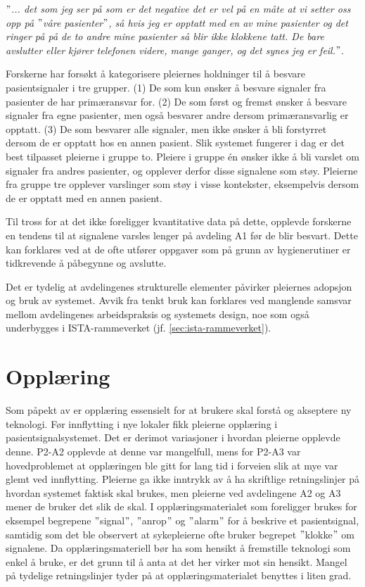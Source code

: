 \noindent
\textit{$"$... det som jeg ser på som er det negative det er vel på en måte at vi setter oss opp på $"$våre pasienter$"$, så hvis jeg er opptatt med en av mine pasienter og det ringer på på de to andre mine pasienter så blir ikke klokkene tatt. De bare avslutter eller kjører telefonen videre, mange ganger, og det synes jeg er feil.$"$}.  
  
\noindent
Forskerne har forsøkt å kategorisere pleiernes holdninger til å besvare pasientsignaler i tre grupper. (1) De som kun ønsker å besvare signaler fra pasienter de har primæransvar for. (2) De som  først og fremst ønsker å besvare signaler fra egne pasienter, men også besvarer andre dersom primæransvarlig er opptatt. (3) De som besvarer alle signaler, men ikke ønsker å bli forstyrret dersom de er opptatt hos en annen pasient. Slik systemet fungerer i dag er det best tilpasset pleierne i gruppe to. Pleiere i gruppe én ønsker ikke å bli varslet om signaler fra andres pasienter, og opplever derfor disse signalene som støy. Pleierne fra gruppe tre opplever varslinger som støy i visse kontekster, eksempelvis dersom de er opptatt med en annen pasient.

\noindent
Til tross for at det ikke foreligger kvantitative data på dette, opplevde forskerne en tendens til at signalene varsles lenger på avdeling A1 før de blir besvart. Dette kan forklares ved at de ofte utfører oppgaver som på grunn av hygienerutiner er tidkrevende å påbegynne og avslutte. 

\noindent
Det er tydelig at avdelingenes strukturelle elementer påvirker pleiernes adopsjon og bruk av systemet. Avvik fra tenkt bruk kan forklares ved manglende samsvar mellom avdelingenes arbeidspraksis og systemets design, noe som også underbygges i ISTA-rammeverket (jf. \ref{sec:ista-rammeverket}). 

\section{Opplæring}
Som påpekt av \citet{Venkatesh99} er opplæring essensielt for at brukere skal forstå og akseptere ny teknologi. Før innflytting i nye lokaler fikk pleierne opplæring i pasientsignalsystemet. Det er derimot variasjoner i hvordan pleierne opplevde denne. P2-A2 opplevde at denne var mangelfull, mens for P2-A3 var hovedproblemet at opplæringen ble gitt for lang tid i forveien slik at mye var glemt ved innflytting. Pleierne ga ikke inntrykk av å ha skriftlige retningslinjer på hvordan systemet faktisk skal brukes, men pleierne ved avdelingene A2 og A3 mener de bruker det slik de skal. I opplæringsmaterialet som foreligger brukes for eksempel begrepene $"$signal$"$, $"$anrop$"$ og $"$alarm$"$ for å beskrive et pasientsignal, samtidig som det ble observert at sykepleierne ofte bruker begrepet $"$klokke$"$ om signalene. Da opplæringsmateriell bør ha som hensikt å fremstille teknologi som enkel å bruke, er det grunn til å anta at det her virker mot sin hensikt. Mangel på tydelige retningslinjer tyder på at opplæringsmaterialet benyttes i liten grad. 

